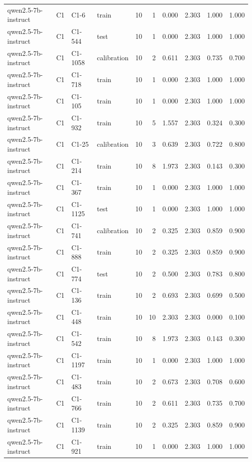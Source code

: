 \begin{table}
\begin{tabular}{llllrrrrrr}
qwen2.5-7b-instruct & C1 & C1-6 & train & 10 & 1 & 0.000 & 2.303 & 1.000 & 1.000 \\
qwen2.5-7b-instruct & C1 & C1-544 & test & 10 & 1 & 0.000 & 2.303 & 1.000 & 1.000 \\
qwen2.5-7b-instruct & C1 & C1-1058 & calibration & 10 & 2 & 0.611 & 2.303 & 0.735 & 0.700 \\
qwen2.5-7b-instruct & C1 & C1-718 & train & 10 & 1 & 0.000 & 2.303 & 1.000 & 1.000 \\
qwen2.5-7b-instruct & C1 & C1-105 & train & 10 & 1 & 0.000 & 2.303 & 1.000 & 1.000 \\
qwen2.5-7b-instruct & C1 & C1-932 & train & 10 & 5 & 1.557 & 2.303 & 0.324 & 0.300 \\
qwen2.5-7b-instruct & C1 & C1-25 & calibration & 10 & 3 & 0.639 & 2.303 & 0.722 & 0.800 \\
qwen2.5-7b-instruct & C1 & C1-214 & train & 10 & 8 & 1.973 & 2.303 & 0.143 & 0.300 \\
qwen2.5-7b-instruct & C1 & C1-367 & train & 10 & 1 & 0.000 & 2.303 & 1.000 & 1.000 \\
qwen2.5-7b-instruct & C1 & C1-1125 & test & 10 & 1 & 0.000 & 2.303 & 1.000 & 1.000 \\
qwen2.5-7b-instruct & C1 & C1-741 & calibration & 10 & 2 & 0.325 & 2.303 & 0.859 & 0.900 \\
qwen2.5-7b-instruct & C1 & C1-888 & train & 10 & 2 & 0.325 & 2.303 & 0.859 & 0.900 \\
qwen2.5-7b-instruct & C1 & C1-774 & test & 10 & 2 & 0.500 & 2.303 & 0.783 & 0.800 \\
qwen2.5-7b-instruct & C1 & C1-136 & train & 10 & 2 & 0.693 & 2.303 & 0.699 & 0.500 \\
qwen2.5-7b-instruct & C1 & C1-448 & train & 10 & 10 & 2.303 & 2.303 & 0.000 & 0.100 \\
qwen2.5-7b-instruct & C1 & C1-542 & train & 10 & 8 & 1.973 & 2.303 & 0.143 & 0.300 \\
qwen2.5-7b-instruct & C1 & C1-1197 & train & 10 & 1 & 0.000 & 2.303 & 1.000 & 1.000 \\
qwen2.5-7b-instruct & C1 & C1-483 & train & 10 & 2 & 0.673 & 2.303 & 0.708 & 0.600 \\
qwen2.5-7b-instruct & C1 & C1-766 & train & 10 & 2 & 0.611 & 2.303 & 0.735 & 0.700 \\
qwen2.5-7b-instruct & C1 & C1-1139 & train & 10 & 2 & 0.325 & 2.303 & 0.859 & 0.900 \\
qwen2.5-7b-instruct & C1 & C1-921 & train & 10 & 1 & 0.000 & 2.303 & 1.000 & 1.000 \\

\end{tabular}
\end{table}
